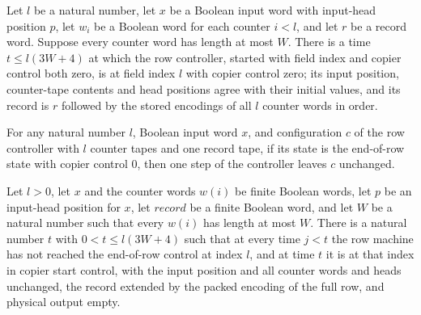 \begin{lemma}
\label{Complexity.clRow_stored}
\leanok
{}
Let $l$ be a natural number, let $x$ be a Boolean input word with input-head position
$p$, let $w_i$ be a Boolean word for each counter $i<l$, and let $r$ be a record word.
Suppose every counter word has length at most $W$. There is a time $t\le l(3W+4)$ at
which the row controller, started with field index and copier control both zero, is at
field index $l$ with copier control zero; its input position, counter-tape contents and
head positions agree with their initial values, and its record is $r$ followed by the
stored encodings of all $l$ counter words in order.
\end{lemma}

\begin{lemma}
\label{Complexity.clRow_idle}
\leanok
{}
For any natural number $l$, Boolean input word $x$, and configuration $c$ of the row
controller with $l$ counter tapes and one record tape, if its state is the end-of-row
state with copier control $0$, then one step of the controller leaves $c$ unchanged.
\end{lemma}

\begin{lemma}
\label{Complexity.clRow_first}
\leanok
{}
Let $l>0$, let $x$ and the counter words $w(i)$ be finite Boolean words, let $p$ be an
input-head position for $x$, let $record$ be a finite Boolean word, and let $W$ be a
natural number such that every $w(i)$ has length at most $W$. There is a natural number
$t$ with $0<t\le l(3W+4)$ such that at every time $j<t$ the row machine has not reached
the end-of-row control at index $l$, and at time $t$ it is at that index in copier start
control, with the input position and all counter words and heads unchanged, the record
extended by the packed encoding of the full row, and physical output empty.
\end{lemma}

